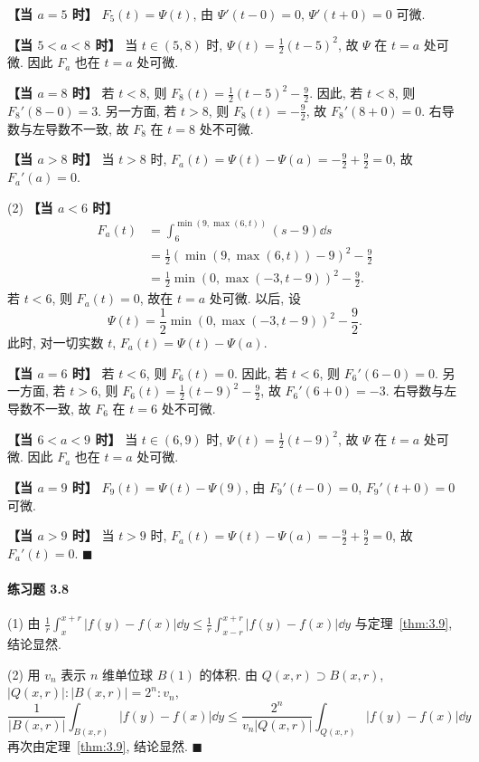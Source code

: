 \textbf{【当 $a = 5$ 时】} $F_{5}(t) = \Psi(t)$, 由 $\Psi'(t-0) = 0$, $\Psi'(t+0) = 0$ 可微.

\textbf{【当 $5 < a < 8$ 时】} 当 $t \in (5, 8)$ 时, $\Psi(t) = \frac{1}{2}(t-5)^{2}$, 故 $\Psi$ 在 $t = a$ 处可微. 因此 $F_{a}$ 也在 $t = a$ 处可微.

\textbf{【当 $a = 8$ 时】} 若 $t < 8$, 则 $F_{8}(t) = \frac{1}{2}(t-5)^{2} - \frac{9}{2}$. 因此, 若 $t < 8$, 则 $F_{8}'(8-0) = 3$. 另一方面, 若 $t > 8$, 则 $F_{8}(t) = -\frac{9}{2}$, 故 $F_{8}'(8+0) = 0$. 右导数与左导数不一致, 故 $F_{8}$ 在 $t = 8$ 处不可微.

\textbf{【当 $a > 8$ 时】} 当 $t > 8$ 时, $F_{a}(t) = \Psi(t) - \Psi(a) = -\frac{9}{2} + \frac{9}{2} = 0$, 故 $F_{a}'(a) = 0$.

(2) \textbf{【当 $a < 6$ 时】}
\begin{align*}
F_{a}(t) &= \int_{6}^{\min(9, \max(6, t))}(s-9)\dd s \\
&= \frac{1}{2}(\min(9, \max(6, t))-9)^{2} - \frac{9}{2} \\
&= \frac{1}{2}\min(0, \max(-3, t-9))^{2} - \frac{9}{2}.
\end{align*}
若 $t < 6$, 则 $F_{a}(t) = 0$, 故在 $t = a$ 处可微. 以后, 设
\[
\Psi(t) = \frac{1}{2}\min(0, \max(-3, t-9))^{2} - \frac{9}{2}.
\]
此时, 对一切实数 $t$, $F_{a}(t) = \Psi(t) - \Psi(a)$.

\textbf{【当 $a = 6$ 时】} 若 $t < 6$, 则 $F_{6}(t) = 0$. 因此, 若 $t < 6$, 则 $F_{6}'(6-0) = 0$. 另一方面, 若 $t > 6$, 则 $F_{6}(t) = \frac{1}{2}(t-9)^{2} - \frac{9}{2}$, 故 $F_{6}'(6+0) = -3$. 右导数与左导数不一致, 故 $F_{6}$ 在 $t = 6$ 处不可微.

\textbf{【当 $6 < a < 9$ 时】} 当 $t \in (6, 9)$ 时, $\Psi(t) = \frac{1}{2}(t-9)^{2}$, 故 $\Psi$ 在 $t = a$ 处可微. 因此 $F_{a}$ 也在 $t = a$ 处可微.

\textbf{【当 $a = 9$ 时】} $F_{9}(t) = \Psi(t) - \Psi(9)$, 由 $F_{9}'(t-0) = 0$, $F_{9}'(t+0) = 0$ 可微.

\textbf{【当 $a > 9$ 时】} 当 $t > 9$ 时, $F_{a}(t) = \Psi(t) - \Psi(a) = -\frac{9}{2} + \frac{9}{2} = 0$, 故 $F_{a}'(t) = 0$. $\blacksquare$

\paragraph*{练习题 3.8}
(1) 由 $\frac{1}{r}\int_{x}^{x+r}|f(y)-f(x)|\dd y \leq \frac{1}{r}\int_{x-r}^{x+r}|f(y)-f(x)|\dd y$ 与定理~\ref{thm:3.9}, 结论显然.

(2) 用 $v_{n}$ 表示 $n$ 维单位球 $B(1)$ 的体积. 由 $Q(x,r) \supset B(x,r)$, $|Q(x,r)| : |B(x,r)| = 2^{n} : v_{n}$,
\[
\frac{1}{|B(x,r)|}\int_{B(x,r)}|f(y)-f(x)|\dd y \leq \frac{2^{n}}{v_{n}|Q(x,r)|}\int_{Q(x,r)}|f(y)-f(x)|\dd y
\]
再次由定理~\ref{thm:3.9}, 结论显然. $\blacksquare$

